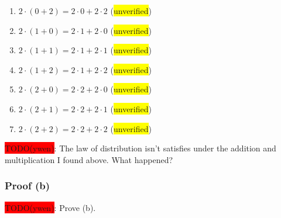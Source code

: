 \documentclass[12pt, letterpaper, oneside]{book}
\begin{document}
\begin{enumerate}
  \item $2 \cdot (0 + 2) = 2 \cdot 0 + 2 \cdot 2$ (\colorbox{yellow}{unverified})
  \item $2 \cdot (1 + 0) = 2 \cdot 1 + 2 \cdot 0$ (\colorbox{yellow}{unverified})
  \item $2 \cdot (1 + 1) = 2 \cdot 1 + 2 \cdot 1$ (\colorbox{yellow}{unverified})
  \item $2 \cdot (1 + 2) = 2 \cdot 1 + 2 \cdot 2$ (\colorbox{yellow}{unverified})
  \item $2 \cdot (2 + 0) = 2 \cdot 2 + 2 \cdot 0$ (\colorbox{yellow}{unverified})
  \item $2 \cdot (2 + 1) = 2 \cdot 2 + 2 \cdot 1$ (\colorbox{yellow}{unverified})
  \item $2 \cdot (2 + 2) = 2 \cdot 2 + 2 \cdot 2$ (\colorbox{yellow}{unverified})
\end{enumerate}

\colorbox{red}{TODO(ywen)}: The law of distribution isn't satisfies under the addition and
multiplication I found above. What happened?

\subsubsection{Proof (b)}

\colorbox{red}{TODO(ywen)}: Prove (b).
\end{document}
